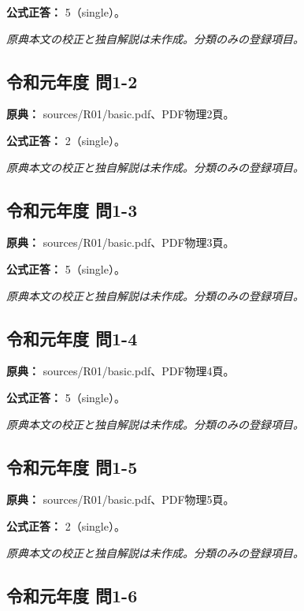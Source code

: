 \textbf{公式正答：} 5（single）。

\par\textit{原典本文の校正と独自解説は未作成。分類のみの登録項目。}

\subsection{令和元年度 問1-2}
\label{q:r01-reg-basic-1-2}

\noindent\textbf{原典：} sources/R01/basic.pdf、PDF物理2頁。

\textbf{公式正答：} 2（single）。

\par\textit{原典本文の校正と独自解説は未作成。分類のみの登録項目。}

\subsection{令和元年度 問1-3}
\label{q:r01-reg-basic-1-3}

\noindent\textbf{原典：} sources/R01/basic.pdf、PDF物理3頁。

\textbf{公式正答：} 5（single）。

\par\textit{原典本文の校正と独自解説は未作成。分類のみの登録項目。}

\subsection{令和元年度 問1-4}
\label{q:r01-reg-basic-1-4}

\noindent\textbf{原典：} sources/R01/basic.pdf、PDF物理4頁。

\textbf{公式正答：} 5（single）。

\par\textit{原典本文の校正と独自解説は未作成。分類のみの登録項目。}

\subsection{令和元年度 問1-5}
\label{q:r01-reg-basic-1-5}

\noindent\textbf{原典：} sources/R01/basic.pdf、PDF物理5頁。

\textbf{公式正答：} 2（single）。

\par\textit{原典本文の校正と独自解説は未作成。分類のみの登録項目。}

\subsection{令和元年度 問1-6}
\label{q:r01-reg-basic-1-6}

